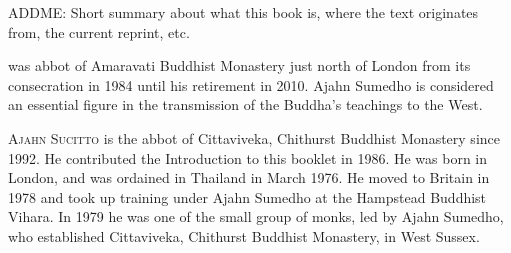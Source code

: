 
{\centering\par
\Large\scshape\chapTitleFont\thetitle
\par}
\vspace*{2\baselineskip}

\noindent%
ADDME: Short summary about what this book is, where the text originates from, the current reprint, etc.
\bigskip

\noindent%
{\scshape \theauthor} was abbot of Amaravati Buddhist Monastery just north of London from its consecration in 1984 until his retirement in 2010. Ajahn Sumedho is considered an essential figure in the transmission of the Buddha's teachings to the West.
\bigskip


\noindent%
{\scshape Ajahn Sucitto} is the abbot of Cittaviveka, Chithurst Buddhist Monastery since 1992. He contributed the Introduction to this booklet in 1986. He was born in London, and was ordained in Thailand in March 1976. He moved to Britain in 1978 and took up training under Ajahn Sumedho at the Hampstead Buddhist Vihara. In 1979 he was one of the small group of monks, led by Ajahn Sumedho, who established Cittaviveka, Chithurst Buddhist Monastery, in West Sussex.
\bigskip

